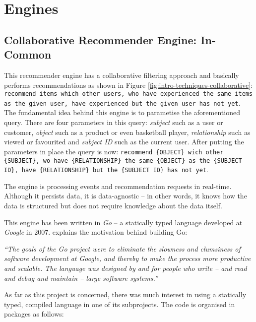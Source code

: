 \section{Engines}

\subsection{Collaborative Recommender Engine: In-Common}

This recommender engine has a collaborative filtering approach and basically performs recommendations as shown in Figure \ref{fig:intro-techniques-collaborative}: \texttt{recommend items which other users, who have experienced the same items as the given user, have experienced but the given user has not yet}. The fundamental idea behind this engine is to parametise the aforementioned query. There are four parameters in this query: \emph{subject} such as a user or customer, \emph{object} such as a product or even basketball player, \emph{relationship} such as viewed or favourited and \emph{subject ID} such as the current user. After putting the parameters in place the query is now: \texttt{recommend \{OBJECT\} wich other \{SUBJECT\}, wo have \{RELATIONSHIP\} the same \{OBJECT\} as the \{SUBJECT ID\}, have \{RELATIONSHIP\} but the \{SUBJECT ID\} has not yet}.

The engine is processing events and recommendation requests in real-time. Although it persists data, it is data-agnostic -- in other words, it knows how the data is structured but does not require knowledge about the data itself.

This engine has been written in \emph{Go} -- a statically typed language developed at \emph{Google} in 2007. \citet{pike12} explains the motivation behind building Go:

\begin{adjustwidth}{1cm}{}
\emph{``The goals of the Go project were to eliminate the slowness and clumsiness of software development at Google, and thereby to make the process more productive and scalable. The language was designed by and for people who write -- and read and debug and maintain -- large software systems.''}
\end{adjustwidth}

As far as this project is concerned, there was much interest in using a statically typed, compiled language in one of its subprojects. The code is organised in packages as follows:


